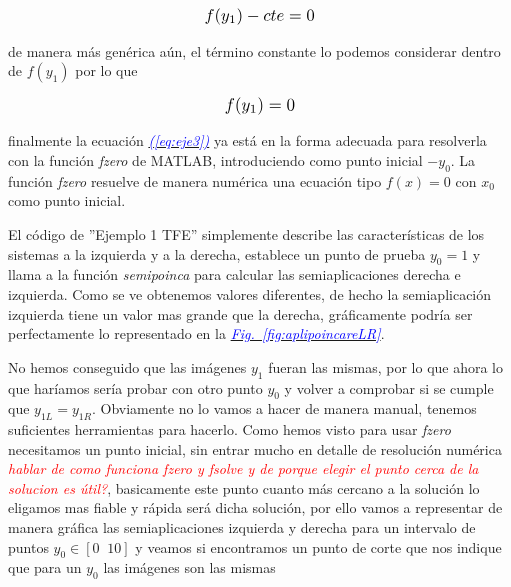 \documentclass[12pt,a4paper]{report} %
\newcommand{\fref}[1]{\hyperref[#1]{\textcolor{blue}{\textit{Fig.~\ref*{#1}}}}}
\newcommand{\eref}[1]{\hyperref[#1]{\textcolor{blue}{\textit{(\ref*{#1})}}}}
\begin{document}
	\begin{equation}
		\label{eq:eje2}
		\scalebox{1.2}{$\displaystyle
				f(y_1)-cte=0
			$}
	\end{equation}\smallskip
	
	\noindent de manera más genérica aún, el término constante lo podemos considerar dentro de $f(y_1)$ por lo que
	
		\begin{equation}
		\label{eq:eje3}
		\scalebox{1.2}{$\displaystyle
				f(y_1)=0
			$}
	\end{equation}\smallskip
	
	\noindent finalmente la ecuación \eref{eq:eje3} ya está en la forma adecuada para resolverla con la función \textit{fzero} de MATLAB, introduciendo como punto inicial $-y_0$. La función \textit{fzero} resuelve de manera numérica una ecuación tipo $f(x)=0$ con $x_0$ como punto inicial.
	
	\vspace{0.5cm}\noindent El código de ''Ejemplo 1 TFE'' simplemente describe las características de los sistemas a la izquierda y a la derecha, establece un punto de prueba $y_0=1$ y llama a la función \textit{semipoinca} para calcular las semiaplicaciones derecha e izquierda. Como se ve obtenemos valores diferentes, de hecho la semiaplicación izquierda tiene un valor mas grande que la derecha, gráficamente podría ser perfectamente lo representado en la \fref{fig:aplipoincareLR}.
	\newpage
	
	No hemos conseguido que las imágenes $y_1$ fueran las mismas, por lo que ahora lo que haríamos sería probar con otro punto $y_0$ y volver a comprobar si se cumple que $y_{1L}=y_{1R}$. Obviamente no lo vamos a hacer de manera manual, tenemos suficientes herramientas para hacerlo. Como hemos visto para usar \textit{fzero} necesitamos un punto inicial, sin entrar mucho en detalle de resolución numérica \textit{\textcolor{red}{hablar de como funciona fzero y fsolve y de porque elegir el punto cerca de la solucion es útil?}}, basicamente este punto cuanto más cercano a la solución lo eligamos mas fiable y rápida será dicha solución, por ello vamos a representar de manera gráfica las semiaplicaciones izquierda y derecha para un intervalo de puntos $y_0 \in [0\;\;10]$ y veamos si encontramos un punto de corte que nos indique que para un $y_0$ las imágenes son las mismas
	
	\vspace{1cm}
	
\end{document}
